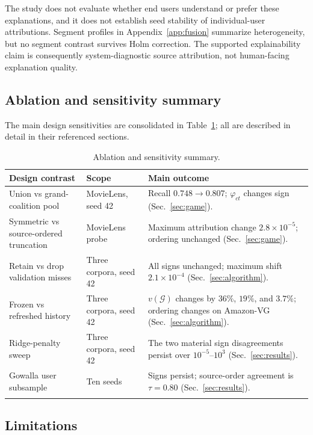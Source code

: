 \documentclass[pdflatex,sn-basic,Numbered]{sn-jnl}
\theoremstyle{plain}
\theoremstyle{definition}
\newcommand{\G}{\mathcal{G}}
\begin{document}
The study does not evaluate whether end users understand or prefer these
explanations, and it does not establish seed stability of individual-user
attributions. Segment profiles in Appendix~\ref{app:fusion} summarize
heterogeneity, but no segment contrast survives Holm correction. The supported
explainability claim is consequently system-diagnostic source attribution, not
human-facing explanation quality.

\subsection{Ablation and sensitivity summary}\label{sec:ablations}

The main design sensitivities are consolidated in Table~\ref{tab:ablations};
all are described in detail in their referenced sections.

\begin{table}[tbp]
\caption{Ablation and sensitivity summary.}
\label{tab:ablations}
\small
\begin{tabularx}{\textwidth}{@{}p{}p{}X@{}}
\toprule
Design contrast & Scope & Main outcome \\
\midrule
Union vs grand-coalition pool & MovieLens, seed 42 & Recall $0.748\to0.807$;
$\varphi_{ct}$ changes sign (Sec.~\ref{sec:game}). \\
Symmetric vs source-ordered truncation & MovieLens probe & Maximum attribution
change $2.8\times10^{-5}$; ordering unchanged (Sec.~\ref{sec:game}). \\
Retain vs drop validation misses & Three corpora, seed 42 & All signs unchanged;
maximum shift $2.1\times10^{-4}$ (Sec.~\ref{sec:algorithm}). \\
Frozen vs refreshed history & Three corpora, seed 42 & $v(\G)$ changes by
$36\%$, $19\%$, and $3.7\%$; ordering changes on Amazon-VG
(Sec.~\ref{sec:algorithm}). \\
Ridge-penalty sweep & Three corpora, seed 42 & The two material sign
disagreements persist over $10^{-5}$--$10^3$ (Sec.~\ref{sec:results}). \\
Gowalla user subsample & Ten seeds & Signs persist; source-order agreement is
$\tau=0.80$ (Sec.~\ref{sec:results}). \\
\botrule
\end{tabularx}
\end{table}

\subsection{Limitations}\label{sec:limitations}
\end{document}
